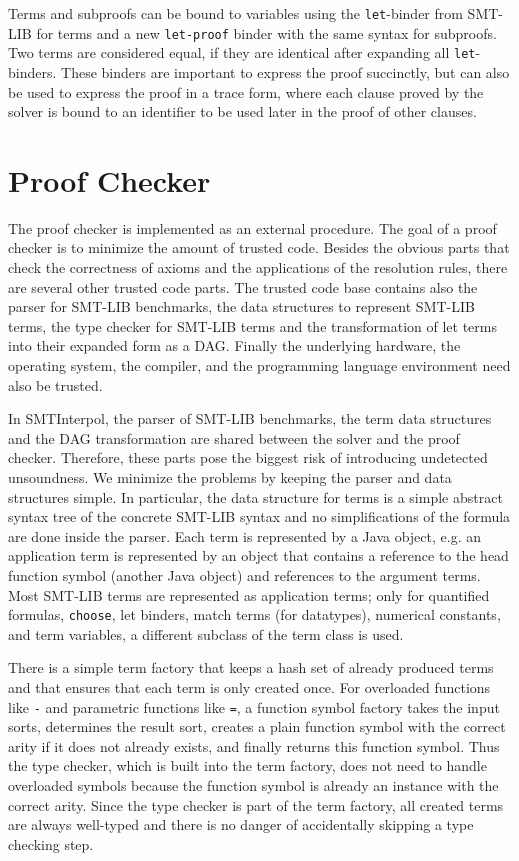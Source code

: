 \documentclass[a4paper]{easychair}
\newcommand\SI{SMTInterpol\xspace}
\newcommand\smtlib[1]{\texttt{#1}}
\begin{document}
Terms and subproofs can be bound to variables using the \smtlib{let}-binder from SMT-LIB for terms and a new \smtlib{let-proof} binder with the same syntax for subproofs.
Two terms are considered equal, if they are identical after expanding all \smtlib{let}-binders.
These binders are important to express the proof succinctly, but can also be used to express the proof in a trace form, where each clause proved by the solver is bound to an identifier to be used later in the proof of other clauses.


\section*{Proof Checker}

The proof checker is implemented as an external procedure.
The goal of a proof checker is to minimize the amount of trusted code.
Besides the obvious parts that check the correctness of axioms and the applications of the resolution rules, there are several other trusted code parts.
The trusted code base contains also the parser for SMT-LIB benchmarks,
the data structures to represent SMT-LIB terms,
the type checker for SMT-LIB terms and the transformation of let terms into their expanded form as a DAG.
Finally the underlying hardware, the operating system, the compiler, and the programming language environment need also be trusted.

In \SI, the parser of SMT-LIB benchmarks, the term data structures and the DAG transformation are shared between the solver and the proof checker.
Therefore, these parts pose the biggest risk of introducing undetected unsoundness.
We minimize the problems by keeping the parser and data structures simple.
In particular, the data structure for terms is a simple abstract syntax tree of the concrete SMT-LIB syntax and no simplifications of the formula are done inside the parser.
Each term is represented by a Java object, e.g. an application term is represented by an object that contains a reference to the head function symbol (another Java object) and references to the argument terms.
Most SMT-LIB terms are represented as application terms; only for quantified formulas, \smtlib{choose}, let binders, match terms (for datatypes), numerical constants, and term variables, a different subclass of the term class is used.

There is a simple term factory that keeps a hash set of already produced terms and that ensures that each term is only created once.
For overloaded functions like \smtlib{-} and parametric functions like \smtlib{=}, a function symbol factory takes the input sorts, determines the result sort, creates a plain function symbol with the correct arity if it does not already exists, and finally returns this function symbol.
Thus the type checker, which is built into the term factory, does not need to handle overloaded symbols because the function symbol is already an instance with the correct arity.
Since the type checker is part of the term factory, all created terms are always well-typed and there is no danger of accidentally skipping a type checking step.
\end{document}
